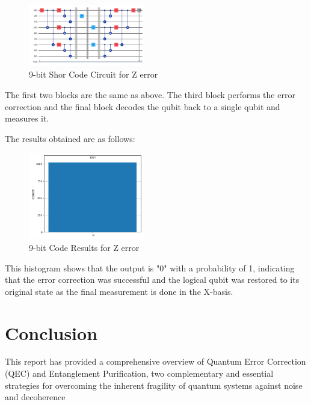 \documentclass[conference]{IEEEtran}
\begin{document}
\begin{figure}[h]
    \centering
    \includegraphics[width=0.45\textwidth]{../Codes/results/9bitCode/FinalCircuit.png}
    \caption{9-bit Shor Code Circuit for Z error}
    \label{fig:9bitCodeCircuit}
\end{figure}

The first two blocks are the same as above. The third block performs the error correction and the final block decodes the qubit back to a single qubit and measures it.

The results obtained are as follows:
\begin{figure}[h]
    \centering
    \includegraphics[width=0.45\textwidth]{../Codes/results/9bitCode/FinalHistogram.png}
    \caption{9-bit Code Results for Z error}
    \label{fig:9bitCodeResults}
\end{figure}

This histogram shows that the output is "0" with a probability of 1, indicating that the error correction was successful and the logical qubit was restored to its original state as the final measurement is done in the X-basis.
\section{Conclusion}
This report has provided a comprehensive overview of Quantum Error Correction (QEC) and Entanglement Purification, two complementary and essential strategies for overcoming the inherent fragility of quantum systems against noise and decoherence
\end{document}
